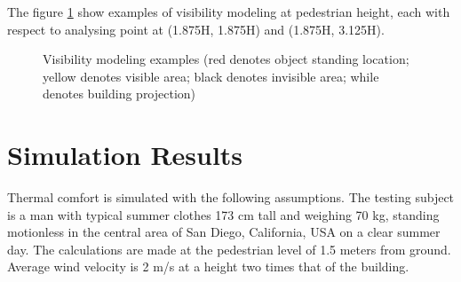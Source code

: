 \documentclass[preprint,3p,12pt,english]{elsarticle}
\begin{document}
The figure \ref{Fig.VisibilityExample} show examples of visibility modeling at pedestrian height, each with respect to analysing point at (1.875H, 1.875H) and (1.875H, 3.125H).


\begin{figure}[H]
\centering  
\graphicspath{ {image/} }

\caption{Visibility modeling examples (red denotes object standing location; yellow denotes visible area; black denotes invisible area; while denotes building projection)}
\label{Fig.VisibilityExample}
\end{figure}



\section{Simulation Results}

Thermal comfort is simulated with the following assumptions. The testing subject is a man with typical summer clothes 173 cm tall and weighing 70 kg, standing motionless in the central area of San Diego, California, USA on a clear summer day. The calculations are made at the pedestrian level of 1.5 meters from ground. Average wind velocity is 2 m/s at a height two times that of the building. 
\end{document}
